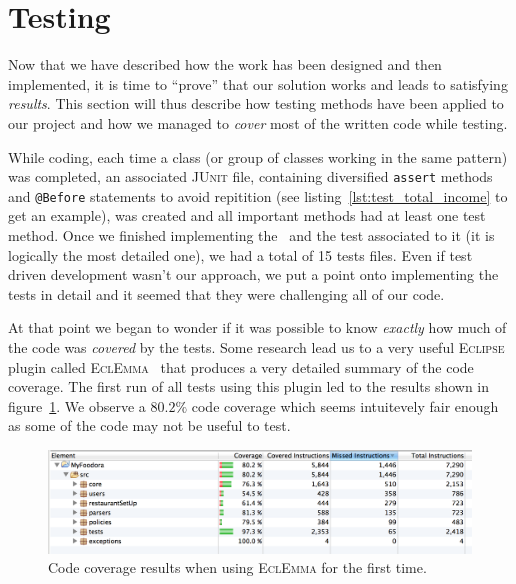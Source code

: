 \section{Testing} %
\label{sec:testing}
Now that we have described how the work has been designed and then implemented,
it is time to ``prove'' that our solution works and leads to satisfying \emph{results}.
This section will thus describe how testing methods have been applied to our project
and how we managed to \emph{cover} most of the written code while testing.

While coding, each time a class (or group of classes working in the same pattern)
was completed, an associated \textsc{JUnit} file, containing diversified \lstinline|assert|
methods and \lstinline|@Before| statements to avoid repitition
(see listing~\ref{lst:test_total_income} to get an example),
was created and all important
methods had at least one test method.
Once we finished implementing the \Core~and the test associated
to it (it is logically the most detailed one), we had a total of 15 tests
files.
Even if test driven development wasn't our approach, we put a point
onto implementing the tests in detail and it seemed that they were
challenging all of our code.

At that point we began to wonder if it was possible to know \emph{exactly}
how much of the code was \emph{covered} by the tests.
Some research lead us to a very useful \textsc{Eclipse} plugin
called \textsc{EclEmma}~\cite{eclemma} that produces a very
detailed summary of the code coverage.
The first run of all tests using this plugin led to the
results shown in figure~\ref{fig:coverage_first}.
We observe a $80.2\%$ code coverage which seems intuitevely
fair enough as some of the code may not be useful to test.

\begin{figure}[h]
  \begin{center}
    \includegraphics[scale=0.47]{./img/coverage_start.png} 
  \end{center}
  \caption{Code coverage results when using \textsc{EclEmma} for
  the first time.}
  \label{fig:coverage_first}
\end{figure} 

